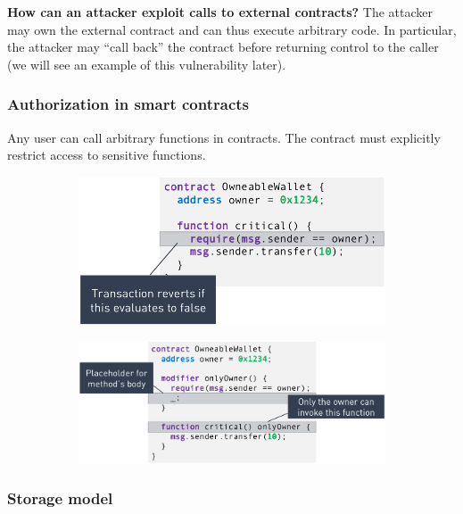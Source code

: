 \documentclass[11pt,oneside,a4paper]{article}
\begin{document}
\textbf{How can an attacker exploit calls to external contracts?}
The attacker may own the external contract and can thus execute arbitrary code. In particular, the attacker may “call back” the contract before returning control to the caller (we will see an example of this vulnerability later).

\subsubsection{Authorization in smart contracts}

Any user can call arbitrary functions in contracts. The contract must explicitly restrict access to sensitive functions.

\vspace{-\topsep}
\begin{figure}[hb]
	\centering
	\begin{subfigure}[t]{.5\textwidth}
		\centering
		\includegraphics[width=0.7\linewidth]{figures/smart_contract_auth}
		\label{fig:smart_contract_auth}
	\end{subfigure}%
	\begin{subfigure}[t]{.5\textwidth}
		\centering
		\includegraphics[width=0.9\linewidth]{figures/smart_contract_auth2}
		\label{fig:smart_contract_auth2}
	\end{subfigure}
\end{figure}
\vspace{-\topsep}

\subsubsection{Storage model}
\end{document}
